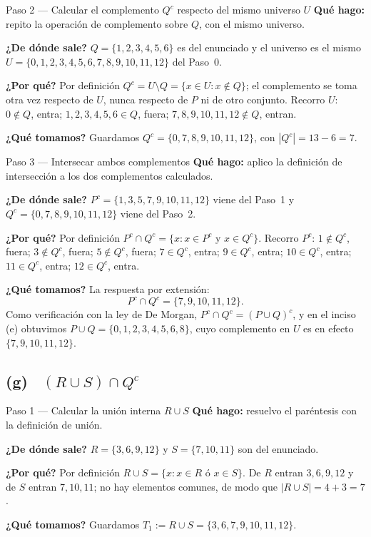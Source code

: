 \documentclass[11pt]{article}
\begin{document}
\begin{paso}{Paso 2 --- Calcular el complemento $Q^{c}$ respecto del mismo universo $U$}
\textbf{Qué hago:} repito la operación de complemento sobre $Q$, con el mismo universo.

\textbf{¿De dónde sale?} $Q=\{1,2,3,4,5,6\}$ es del enunciado y el universo es el mismo
$U=\{0,1,2,3,4,5,6,7,8,9,10,11,12\}$ del Paso~0.

\textbf{¿Por qué?} Por definición $Q^{c}=U\setminus Q=\{x\in U: x\notin Q\}$; el complemento
se toma otra vez respecto de $U$, nunca respecto de $P$ ni de otro conjunto. Recorro $U$:
$0\notin Q$, entra; $1,2,3,4,5,6\in Q$, fuera; $7,8,9,10,11,12\notin Q$, entran.

\textbf{¿Qué tomamos?} Guardamos $Q^{c}=\{0,7,8,9,10,11,12\}$, con $|Q^{c}|=13-6=7$.
\end{paso}

\begin{paso}{Paso 3 --- Intersecar ambos complementos}
\textbf{Qué hago:} aplico la definición de intersección a los dos complementos calculados.

\textbf{¿De dónde sale?} $P^{c}=\{1,3,5,7,9,10,11,12\}$ viene del Paso~1 y
$Q^{c}=\{0,7,8,9,10,11,12\}$ viene del Paso~2.

\textbf{¿Por qué?} Por definición $P^{c}\cap Q^{c}=\{x: x\in P^{c} \text{ y } x\in Q^{c}\}$.
Recorro $P^{c}$: $1\notin Q^{c}$, fuera; $3\notin Q^{c}$, fuera; $5\notin Q^{c}$, fuera;
$7\in Q^{c}$, entra; $9\in Q^{c}$, entra; $10\in Q^{c}$, entra; $11\in Q^{c}$, entra;
$12\in Q^{c}$, entra.

\textbf{¿Qué tomamos?} La respuesta por extensión:
\[
P^{c}\cap Q^{c}=\{7,9,10,11,12\}.
\]
Como verificación con la ley de De Morgan, $P^{c}\cap Q^{c}=(P\cup Q)^{c}$, y en el inciso (e)
obtuvimos $P\cup Q=\{0,1,2,3,4,5,6,8\}$, cuyo complemento en $U$ es en efecto
$\{7,9,10,11,12\}$.
\end{paso}

\subsection*{(g) \ $(R\cup S)\cap Q^{c}$}

\begin{paso}{Paso 1 --- Calcular la unión interna $R\cup S$}
\textbf{Qué hago:} resuelvo el paréntesis con la definición de unión.

\textbf{¿De dónde sale?} $R=\{3,6,9,12\}$ y $S=\{7,10,11\}$ son del enunciado.

\textbf{¿Por qué?} Por definición $R\cup S=\{x: x\in R \text{ ó } x\in S\}$. De $R$ entran
$3,6,9,12$ y de $S$ entran $7,10,11$; no hay elementos comunes, de modo que
$|R\cup S|=4+3=7$.

\textbf{¿Qué tomamos?} Guardamos $T_1:=R\cup S=\{3,6,7,9,10,11,12\}$.
\end{paso}
\end{document}

